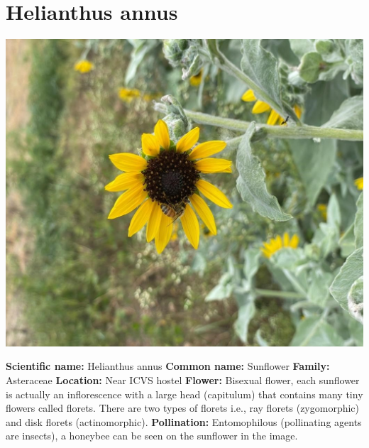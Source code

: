 \documentclass{article}
\begin{document}
\section{Helianthus annus}
\begin{center}
    \includegraphics[scale=0.2]{images/1.jpg}
\end{center}
\textbf{Scientific name:} Helianthus annus\newline
\textbf{Common name:} Sunflower\newline
\textbf{Family:} Asteraceae\newline
\textbf{Location:} Near ICVS hostel\newline
\textbf{Flower:} Bisexual flower, each sunflower is actually an inflorescence with a large head (capitulum) that contains many tiny flowers called florets. There are two types of florets i.e., ray florets (zygomorphic) and disk florets (actinomorphic). \newline
\textbf{Pollination:} Entomophilous (pollinating agents are insects), a honeybee can be seen on the sunflower in the image.
\end{document}
